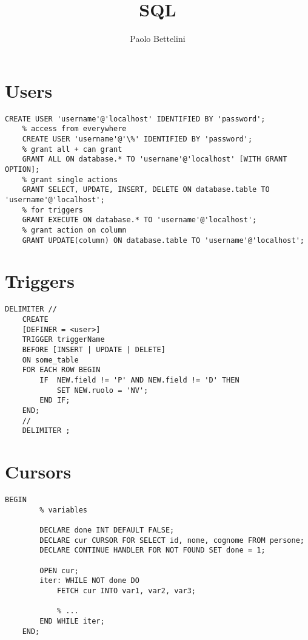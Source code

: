 \documentclass{article}
\title{SQL}
\author{Paolo Bettelini}
\date{}
\begin{document}
\maketitle
\tableofcontents
\pagebreak

\section{Users}

\begin{lstlisting}[style=sql]
    CREATE USER 'username'@'localhost' IDENTIFIED BY 'password';
    % access from everywhere
    CREATE USER 'username'@'\%' IDENTIFIED BY 'password';
    % grant all + can grant
    GRANT ALL ON database.* TO 'username'@'localhost' [WITH GRANT OPTION];
    % grant single actions
    GRANT SELECT, UPDATE, INSERT, DELETE ON database.table TO 'username'@'localhost';
    % for triggers
    GRANT EXECUTE ON database.* TO 'username'@'localhost';
    % grant action on column
    GRANT UPDATE(column) ON database.table TO 'username'@'localhost';
\end{lstlisting}

\section{Triggers}

\begin{lstlisting}[style=sql]
    DELIMITER //
    CREATE
    [DEFINER = <user>]
    TRIGGER triggerName
    BEFORE [INSERT | UPDATE | DELETE]
    ON some_table
    FOR EACH ROW BEGIN
        IF  NEW.field != 'P' AND NEW.field != 'D' THEN
            SET NEW.ruolo = 'NV';
        END IF;
    END;
    // 
    DELIMITER ;
\end{lstlisting}

\section{Cursors}

\begin{lstlisting}[style=sql]
    BEGIN
        % variables
        
        DECLARE done INT DEFAULT FALSE;
        DECLARE cur CURSOR FOR SELECT id, nome, cognome FROM persone;
        DECLARE CONTINUE HANDLER FOR NOT FOUND SET done = 1;

        OPEN cur;
        iter: WHILE NOT done DO
            FETCH cur INTO var1, var2, var3;

            % ...
        END WHILE iter;
    END;
\end{lstlisting}
\end{document}
